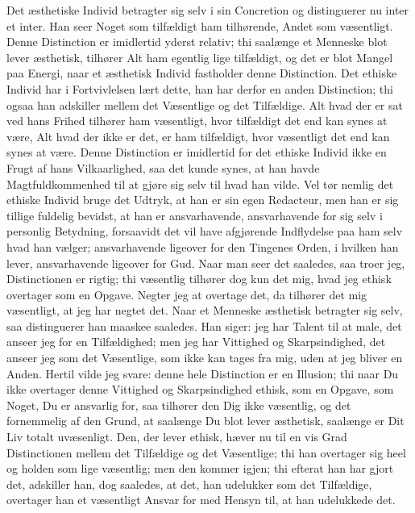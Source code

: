 \documentclass[12pt,a4paper]{article}
\begin{document}
Det æsthetiske Individ betragter sig selv i sin Concretion og distinguerer nu inter et inter. Han seer Noget som tilfældigt ham tilhørende, Andet som væsentligt. Denne Distinction er imidlertid yderst relativ; thi saalænge et Menneske blot lever æsthetisk, tilhører Alt ham egentlig lige tilfældigt, og det er blot Mangel paa Energi, naar et æsthetisk Individ fastholder denne Distinction. Det ethiske Individ har i Fortvivlelsen lært dette, han har derfor en anden Distinction; thi ogsaa han adskiller mellem det Væsentlige og det Tilfældige. Alt hvad der er sat ved hans Frihed tilhører ham væsentligt, hvor tilfældigt det end kan synes at være, Alt hvad der ikke er det, er ham tilfældigt, hvor væsentligt det end kan synes at være. Denne Distinction er imidlertid for det ethiske Individ ikke en Frugt af hans Vilkaarlighed, saa det kunde synes, at han havde Magtfuldkommenhed til at gjøre sig selv til hvad han vilde. Vel tør nemlig det ethiske Individ bruge det Udtryk, at han er sin egen Redacteur, men han er sig tillige fuldelig bevidst, at han er ansvarhavende, ansvarhavende for sig selv i personlig Betydning, forsaavidt det vil have afgjørende Indflydelse paa ham selv hvad han vælger; ansvarhavende ligeover for den Tingenes Orden, i hvilken han lever, ansvarhavende ligeover for Gud. Naar man seer det saaledes, saa troer jeg, Distinctionen er rigtig; thi væsentlig tilhører dog kun det mig, hvad jeg ethisk overtager som en Opgave. Negter jeg at overtage det, da tilhører det mig væsentligt, at jeg har negtet det. Naar et Menneske æsthetisk betragter sig selv, saa distinguerer han maaskee saaledes. Han siger: jeg har Talent til at male, det anseer jeg for en Tilfældighed; men jeg har Vittighed og Skarpsindighed, det anseer jeg som det Væsentlige, som ikke kan tages fra mig, uden at jeg bliver en Anden. Hertil vilde jeg svare: denne hele Distinction er en Illusion; thi naar Du ikke overtager denne Vittighed og Skarpsindighed ethisk, som en Opgave, som Noget, Du er ansvarlig for, saa tilhører den Dig ikke væsentlig, og det fornemmelig af den Grund, at saalænge Du blot lever æsthetisk, saalænge er Dit Liv totalt uvæsenligt. Den, der lever ethisk, hæver nu til en vis Grad Distinctionen mellem det Tilfældige og det Væsentlige; thi han overtager sig heel og holden som lige væsentlig; men den kommer igjen; thi efterat han har gjort det, adskiller han, dog saaledes, at det, han udelukker som det Tilfældige, overtager han et væsentligt Ansvar for med Hensyn til, at han udelukkede det.
\end{document}
